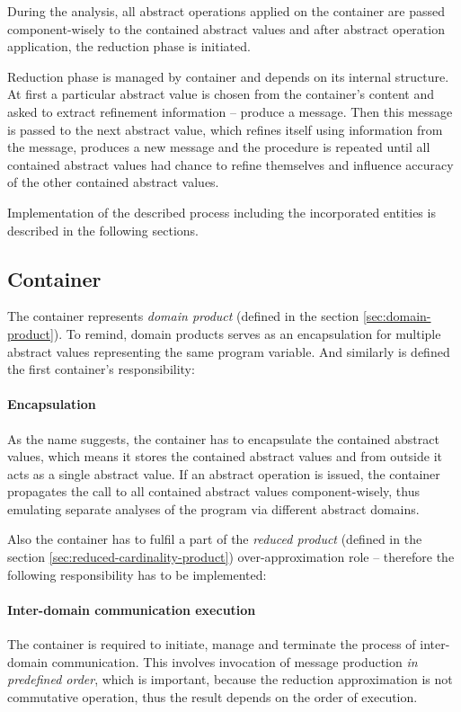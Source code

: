\documentclass[12pt,oneside]{fithesis2}
\theoremstyle{definition}
\begin{document}
During the analysis, all abstract operations applied on the container are passed component-wisely to the contained abstract values and after abstract operation application, the reduction phase is initiated.

Reduction phase is managed by container and depends on its internal structure. At first a particular abstract value is chosen from the container's content and asked to extract refinement information -- produce a message. Then this message is passed to the next abstract value, which refines itself using information from the message, produces a new message and the procedure is repeated until all contained abstract values had chance to refine themselves and influence accuracy of the other contained abstract values.

Implementation of the described process including the incorporated entities is described in the following sections.

\subsection{Container}

The container represents \textit{domain product} (defined in the section \ref{sec:domain-product}). To remind, domain products serves as an encapsulation for multiple abstract values representing the same program variable. And similarly is defined the first container's responsibility:

\paragraph{Encapsulation}
As the name suggests, the container has to encapsulate the contained abstract values, which means it stores the contained abstract values and from outside it acts as a single abstract value. If an abstract operation is issued, the container propagates the call to all contained abstract values component-wisely, thus emulating separate analyses of the program via different abstract domains.

\vspace{1\baselineskip} %

Also the container has to fulfil a part of the \textit{reduced product} (defined in the section \ref{sec:reduced-cardinality-product}) over-approximation role -- therefore the following responsibility has to be implemented:

\paragraph{Inter-domain communication execution}
The container is required to initiate, manage and terminate the process of inter-domain communication. This involves invocation of message production \textit{in predefined order}, which is important, because the reduction approximation is not commutative operation, thus the result depends on the order of execution.
\end{document}
